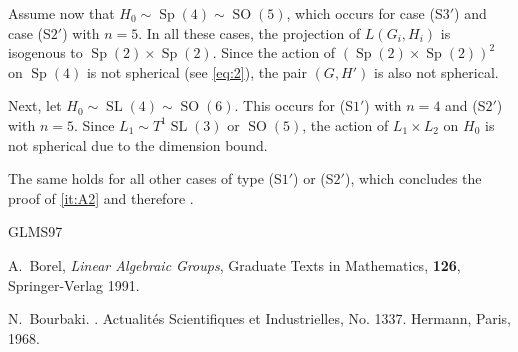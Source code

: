 \documentclass[12pt]{amsart}
\newcommand\SL{\operatorname{SL}}
\newcommand\Sp{\operatorname{Sp}}
\newcommand\SOO{\operatorname{SO}}
\numberwithin{equation}{section}
\theoremstyle{definition}
\begin{document}
Assume now that $H_0\sim\Sp(4)\sim\SOO(5)$, which occurs for case (S$3'$) and
case (S$2'$) with $n=5$. In all these cases, the projection of $L(G_i,H_i)$
is isogenous to $\Sp(2)\times\Sp(2)$. Since the action of
$(\Sp(2)\times\Sp(2))^2$ on $\Sp(4)$ is not spherical (see \eqref{eq:2}),
the pair $(G,H')$ is also not spherical.

Next, let $H_0\sim\SL(4)\sim\SOO(6)$. This occurs for (S$1'$) with
$n=4$ and (S$2'$) with $n=5$. Since $L_1\sim T^1\SL(3)$ or
$\SOO(5)$, the action of $L_1\times L_2$ on $H_0$ is not spherical due
to the dimension bound.

The same holds for all other cases of type (S$1'$) or (S$2'$), which concludes the proof of \ref{it:A2} and therefore .



\begin{thebibliography}{GLMS97}

  \newcommand{\etalchar}[1]{$^{#1}$}
  \providecommand{\bysame}{\leavevmode\hbox
    to3em{\hrulefill}\thinspace}
  \providecommand{\MR}{\relax\ifhmode\unskip\space\fi MR }
  \providecommand{\MRhref}[2]{%
    \href{http://www.ams.org/mathscinet-getitem?mr=#1}{#2} }
  \providecommand{\href}[2]{#2}







 A.~Borel, \emph{Linear Algebraic Groups},
  Graduate Texts in Mathematics, \textbf{126}, Springer-Verlag 1991.


 N.~Bourbaki.
  .
  \newblock Actualités Scientifiques et Industrielles,
  No. 1337. Hermann, Paris, 1968.


\end{thebibliography}
\end{document}
